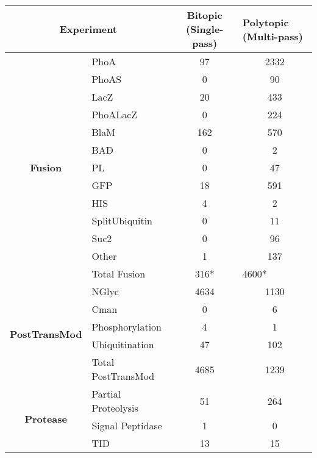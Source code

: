 \begin{table}[htbp]
{\begin{tabular}{cp{5em}cp{5em}}
    \multicolumn{2}{p{10em}}{\textbf{Experiment}} & \multicolumn{1}{p{5em}}{\textbf{Bitopic (Single-pass)}} & \textbf{Polytopic (Multi-pass)} \\
    \midrule
    \multicolumn{1}{c}{\multirow{13}[26]{*}{\textbf{Fusion}}} & PhoA  & 97    & \multicolumn{1}{c}{2332} \\
\cmidrule{2-4}          & PhoAS & 0     & \multicolumn{1}{c}{90} \\
\cmidrule{2-4}          & LacZ  & 20    & \multicolumn{1}{c}{433} \\
\cmidrule{2-4}          & PhoALacZ & 0     & \multicolumn{1}{c}{224} \\
\cmidrule{2-4}          & BlaM  & 162   & \multicolumn{1}{c}{570} \\
\cmidrule{2-4}          & BAD   & 0     & \multicolumn{1}{c}{2} \\
\cmidrule{2-4}          & PL    & 0     & \multicolumn{1}{c}{47} \\
\cmidrule{2-4}          & GFP   & 18    & \multicolumn{1}{c}{591} \\
\cmidrule{2-4}          & HIS   & 4     & \multicolumn{1}{c}{2} \\
\cmidrule{2-4}          & SplitUbiquitin & 0     & \multicolumn{1}{c}{11} \\
\cmidrule{2-4}          & Suc2  & 0     & \multicolumn{1}{c}{96} \\
\cmidrule{2-4}          & Other & 1     & \multicolumn{1}{c}{137} \\
\cmidrule{2-4}          & Total Fusion & \multicolumn{1}{p{5em}}{316*} & 4600* \\
    \midrule
    \multicolumn{1}{c}{\multirow{5}[10]{*}{\textbf{PostTransMod}}} & NGlyc & 4634  & \multicolumn{1}{c}{1130} \\
\cmidrule{2-4}          & Cman  & 0     & \multicolumn{1}{c}{6} \\
\cmidrule{2-4}          & Phosphorylation & 4     & \multicolumn{1}{c}{1} \\
\cmidrule{2-4}          & Ubiquitination & 47    & \multicolumn{1}{c}{102} \\
\cmidrule{2-4}          & Total PostTransMod & 4685  & \multicolumn{1}{c}{1239} \\
    \midrule
    \multicolumn{1}{c}{\multirow{4}[8]{*}{\textbf{Protease}}} & Partial Proteolysis & 51    & \multicolumn{1}{c}{264} \\
\cmidrule{2-4}          & Signal Peptidase & 1     & \multicolumn{1}{c}{0} \\
\cmidrule{2-4}          & TID   & 13    & \multicolumn{1}{c}{15} \\

\end{tabular}}
\end{table}
